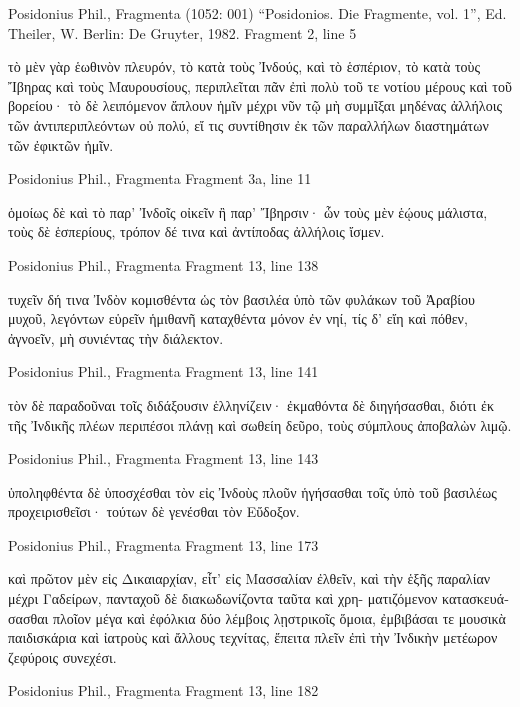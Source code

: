 \documentclass[12pt,letterpaper,twoside,final]{memoir}
\begin{document}
\begin{greek}
Posidonius Phil., Fragmenta (1052: 001)
“Posidonios. Die Fragmente, vol. 1”, Ed. Theiler, W.
Berlin: De Gruyter, 1982.
Fragment 2, line 5

τὸ μὲν γὰρ ἑωθινὸν πλευρόν, τὸ κατὰ τοὺς Ἰνδούς, καὶ τὸ ἑσπέριον, τὸ 
κατὰ τοὺς Ἴβηρας καὶ τοὺς Μαυρουσίους, περιπλεῖται πᾶν ἐπὶ πολὺ τοῦ 
τε νοτίου μέρους καὶ τοῦ βορείου· τὸ δὲ λειπόμενον ἄπλουν ἡμῖν μέχρι 
νῦν τῷ μὴ συμμῖξαι μηδένας ἀλλήλοις τῶν ἀντιπεριπλεόντων οὐ πολύ, εἴ   
τις συντίθησιν ἐκ τῶν παραλλήλων διαστημάτων τῶν ἐφικτῶν ἡμῖν. 



Posidonius Phil., Fragmenta 
Fragment 3a, line 11

ὁμοίως δὲ καὶ τὸ παρ' Ἰνδοῖς οἰκεῖν ἢ παρ' Ἴβηρσιν· ὧν τοὺς μὲν ἑῴους 
μάλιστα, τοὺς δὲ ἑσπερίους, τρόπον δέ τινα καὶ ἀντίποδας ἀλλήλοις ἴσμεν. 



Posidonius Phil., Fragmenta 
Fragment 13, line 138

                                                               τυχεῖν δή τινα 
Ἰνδὸν κομισθέντα ὡς τὸν βασιλέα ὑπὸ τῶν φυλάκων τοῦ Ἀραβίου μυχοῦ, 
λεγόντων εὑρεῖν ἡμιθανῆ καταχθέντα μόνον ἐν νηί, τίς δ' εἴη καὶ πόθεν, 
ἀγνοεῖν, μὴ συνιέντας τὴν διάλεκτον. 



Posidonius Phil., Fragmenta 
Fragment 13, line 141

                                           τὸν δὲ παραδοῦναι τοῖς διδάξουσιν 
ἑλληνίζειν· ἐκμαθόντα δὲ διηγήσασθαι, διότι ἐκ τῆς Ἰνδικῆς πλέων 
περιπέσοι πλάνῃ καὶ σωθείη δεῦρο, τοὺς σύμπλους ἀποβαλὼν λιμῷ. 



Posidonius Phil., Fragmenta 
Fragment 13, line 143

ὑποληφθέντα δὲ ὑποσχέσθαι τὸν εἰς Ἰνδοὺς πλοῦν ἡγήσασθαι τοῖς ὑπὸ 
τοῦ βασιλέως προχειρισθεῖσι· τούτων δὲ γενέσθαι τὸν Εὔδοξον. 



Posidonius Phil., Fragmenta 
Fragment 13, line 173

καὶ πρῶτον μὲν εἰς Δικαιαρχίαν, εἶτ' εἰς Μασσαλίαν ἐλθεῖν, καὶ τὴν ἑξῆς 
παραλίαν μέχρι Γαδείρων, πανταχοῦ δὲ διακωδωνίζοντα ταῦτα καὶ χρη-
ματιζόμενον κατασκευάσασθαι πλοῖον μέγα καὶ ἐφόλκια δύο λέμβοις 
λῃστρικοῖς ὅμοια, ἐμβιβάσαι τε μουσικὰ παιδισκάρια καὶ ἰατροὺς καὶ 
ἄλλους τεχνίτας, ἔπειτα πλεῖν ἐπὶ τὴν Ἰνδικὴν μετέωρον ζεφύροις 
συνεχέσι. 



Posidonius Phil., Fragmenta 
Fragment 13, line 182


\end{greek}
\end{document}
